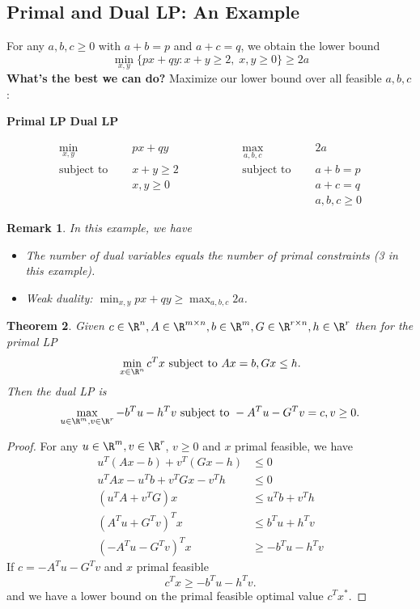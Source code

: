 \documentclass[a4paper]{article}
\newtheorem{thm}{Theorem}[section]
\newtheorem{rmk}[thm]{Remark}
\begin{document}
\subsection{Primal and Dual LP: An Example}
For any $a,b,c \geq 0$ with $a+b=p$ and $a+c=q$, we obtain the lower bound
\[
    \min_{x,y} \{ px + qy : x+y \geq 2,\; x,y \geq 0 \} \geq 2a
\]
\textbf{What's the best we can do?} Maximize our lower bound over all feasible $a,b,c$:
\begin{center}
    \textbf{Primal LP} \hfill \textbf{Dual LP}
\end{center}
\begin{align*}
    \min_{x,y} \quad & px + qy & \qquad \qquad & \max_{a,b,c} \quad & 2a \\
    \text{subject to } \quad & x + y \geq 2 & & \text{subject to } \quad & a + b = p \\
    & x, y \geq 0 & & & a + c = q \\
    & & & & a, b, c \geq 0
\end{align*}
\begin{rmk}
    In this example, we have 
    \begin{itemize}
        \item The number of dual variables equals the number of primal constraints (3 in this example).
        \item Weak duality: $\min_{x,y} px + qy \geq \max_{a,b,c} 2a$.
    \end{itemize}
\end{rmk}
\begin{thm}
    Given $c\in \R^n,A\in \R^{m\times n},b\in \R^m,G\in \R^{r\times n},h\in \R^r$ then for the primal LP 
    \[
    \min_{x\in \R^n} c^T x \text{ subject to } Ax=b, Gx\leq h
    .\] 
    Then the dual LP is 
    \[
    \max_{u\in \R^m,v\in \R^r} -b^T u-h^Tv \text{ subject to } -A^T u - G^T v = c, v\geq 0
    .\] 
\end{thm}
\begin{proof}
    For any $u\in \R^m,v\in \R^r$, $v\geq 0$ and $x$ primal feasible, we have 
    \begin{align*}
        u^T(Ax-b)+v^T(Gx-h)&\leq 0 \\
        u^TAx-u^Tb+v^TGx-v^Th&\leq 0 \\
        (u^T A + v^T G)x &\leq u^T b + v^T h \\
        (A^T u + G^T v)^T x &\leq b^T u + h^T v \\
        (-A^T u - G^T v)^T x &\geq -b^T u - h^T v
    \end{align*}
    If $c=-A^T u - G^T v$ and $x$ primal feasible
    \[
    c^T x\geq -b^T u - h^T v
    .\]  
    and we have a lower bound on the primal feasible optimal value $c^T x^*$.
\end{proof}
\end{document}
